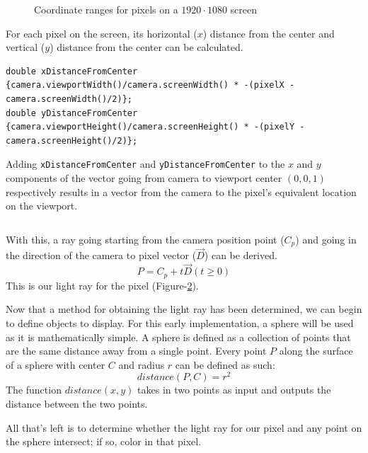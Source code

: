 \documentclass[a4paper]{article}
\newenvironment{code}{\captionsetup{type=listing}}{}
\begin{document}
\begin{figure}[htp]
    \centering
    
    \caption{Coordinate ranges for pixels on a $1920\cdot1080$ screen}\label{figure:figure7}
\end{figure}

For each pixel on the screen, its horizontal ($x$) distance from the center and vertical ($y$) distance from the center can be calculated.
\begin{code}
\begin{verbatim}
double xDistanceFromCenter {camera.viewportWidth()/camera.screenWidth() * -(pixelX - camera.screenWidth()/2)};
double yDistanceFromCenter {camera.viewportHeight()/camera.screenHeight() * -(pixelY - camera.screenHeight()/2)}; 
\end{verbatim}
\end{code}
Adding \texttt{xDistanceFromCenter} and \texttt{yDistanceFromCenter} to the $x$ and $y$ components of the vector going from camera to viewport center $(0, 0, 1)$ respectively results in a vector from the camera to the pixel's equivalent location on the viewport.

\begin{code}
\inputminted[breaklines]{cpp}{getPixelLine.cpp}
\end{code}

With this, a ray going starting from the camera position point ($C_{p}$) and going in the direction of the camera to pixel vector ($\vec{D}$) can be derived.
\[
P = C_{p} + t\vec{D} (t \geq 0)
\]
This is our light ray for the pixel (Figure-\ref{figure:lightray}).


\begin{figure}[t]
    
    \caption{}\label{figure:lightray}
\end{figure}

Now that a method for obtaining the light ray has been determined, we can begin to define objects to display. For this early implementation, a sphere will be used as it is mathematically simple. A sphere is defined as a collection of points that are the same distance away from a single point. Every point $P$ along the surface of a sphere with center $C$ and radius $r$ can be defined as such:
\[
distance(P, C) = r^{2}
\]
The function $distance(x, y)$ takes in two points as input and outputs the distance between the two points.

All that's left is to determine whether the light ray for our pixel and any point on the sphere intersect; if so, color in that pixel.
\end{document}
